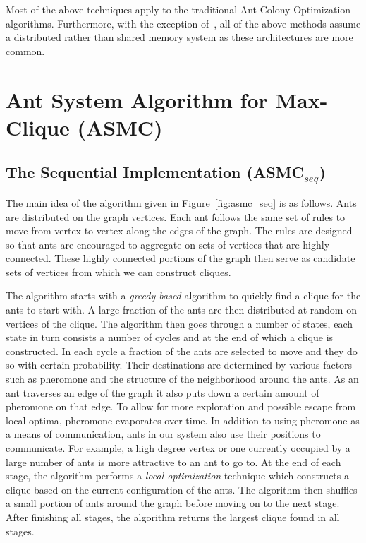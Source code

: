 \documentclass[11pt]{article}
\begin{document}
Most of the above techniques apply to the traditional Ant Colony Optimization algorithms.  Furthermore, with the exception of~\cite{paper_using_openmp}, all of the above methods assume a distributed rather than shared memory system as these architectures are more common.




\section{Ant System Algorithm for Max-Clique (ASMC)}\label{algorithm}


\subsection{The Sequential Implementation (ASMC$_{seq}$)}\label{ASMC_seq} 

The main idea of the algorithm given in Figure~\ref{fig:asmc_seq} is as follows.  Ants are distributed on the graph vertices.  Each ant follows the same set of rules to move from vertex to vertex along the edges of the graph.  The rules are designed so that ants are encouraged to aggregate on sets of vertices that are highly connected.  These highly connected portions of the graph then serve as candidate sets of vertices from which we can construct cliques.

The algorithm starts with a \textit{greedy-based} algorithm to quickly find a clique for the ants to start with.  A large fraction of the ants are then distributed at random on vertices of the clique.  The algorithm then goes through a number of states, each state in turn consists a number of cycles and at the end of which a clique is constructed. In each cycle a fraction of the ants are selected to move and they do so with certain probability.  Their destinations are determined by various factors such as pheromone and the structure of the neighborhood around the ants.  As an ant traverses an edge of the graph it also puts down a certain amount of pheromone on that edge.  To allow for more exploration and possible escape from local optima, pheromone evaporates over time.  In addition to using pheromone as a means of communication, ants in our system also use their positions to communicate.  For example, a high degree vertex or one currently occupied by a large number of ants is more attractive to an ant to go to. At the end of each stage, the algorithm performs a \textit{local optimization} technique which constructs a clique based on the current configuration of the ants. The algorithm then shuffles a small portion of ants around the graph before moving on to the next stage. After finishing all stages, the algorithm returns the largest clique found in all stages. %
\end{document}

